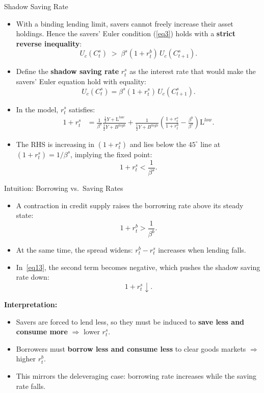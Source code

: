 \documentclass[11pt,aspectratio=169]{beamer}
\begin{document}
\begin{frame}{Shadow Saving Rate}
\small
\begin{itemize}
  \item With a binding lending limit, savers cannot freely increase their asset holdings.
  Hence the savers' Euler condition (\ref{eq3}) holds with a \textbf{strict reverse inequality}:
  \[
    U_c(C_t^s)\;>\;\beta^s(1+r_t^b)\,U_c(C_{t+1}^s).
  \]
  

  \item Define the \textbf{shadow saving rate} $r_t^s$ as the interest rate that would make the savers' Euler equation hold with equality:
  \[
    U_c(C_t^s)=\beta^s(1+r_t^s)\,U_c(C_{t+1}^s).
  \]
  \item In the model, $r_t^s$ satisfies:
  \begin{align}
    1+r_t^s
    &= \frac{1}{\beta^s}\frac{\frac{1}{2}Y+\mathrm{L}^{low}}{\frac{1}{2}Y+B^{high}}
    +\frac{1}{\frac{1}{2}Y+B^{high}}
      \left(\frac{1+r_t^s}{1+r_t^b}-\frac{\beta^b}{\beta^s}\right)\mathrm{L}^{low}.
    \label{eq13}
  \end{align}

  \item The RHS is increasing in $(1+r_t^s)$ and lies below the $45^\circ$ line at $(1+r_t^s)=1/\beta^s$,
  implying the fixed point:
  \[
    1+r_t^s<\frac{1}{\beta^s}.
  \]
\end{itemize}
\end{frame}


\begin{frame}{Intuition: Borrowing vs.\ Saving Rates}
\small
\begin{itemize}
  \item A contraction in credit supply raises the borrowing rate above its steady state:
  \[
    1+r_t^b>\frac{1}{\beta^b}.
  \]
  \item At the same time, the spread widens: $r_t^b-r_t^s$ increases when lending falls.
  \vspace{0.25em}
  \item In~\eqref{eq13}, the second term becomes negative, which pushes the shadow saving rate down:
  \[
    1+r_t^s \downarrow.
  \]
\end{itemize}
\textbf{Interpretation:}
\begin{itemize}
    \item Savers are forced to lend less, so they must be induced to \textbf{save less and consume more} $\Rightarrow$ lower $r_t^s$.
    \item Borrowers must \textbf{borrow less and consume less} to clear goods markets $\Rightarrow$ higher $r_t^b$.
  \item This mirrors the deleveraging case: borrowing rate increases while the saving rate falls.
\end{itemize}
\end{frame}
\end{document}
